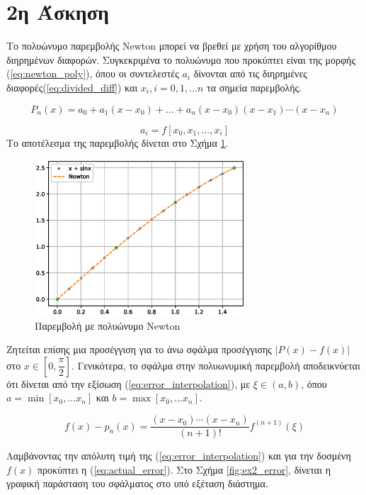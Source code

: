 \documentclass[assignment3.tex]{subfiles}
\begin{document}
\section*{2η Άσκηση}
Το πολυώνυμο παρεμβολής \textlatin{Newton} μπορεί να βρεθεί με χρήση του αλγορίθμου διηρημένων διαφορών. Συγκεκριμένα το πολυώνυμο που προκύπτει είναι της μορφής (\ref{eq:newton_poly}), όπου οι συντελεστές $a_i$ δίνονται από τις διηρημένες διαφορές(\ref{eq:divided_diff}) και $x_i,i=0,1,\dots n$ τα σημεία παρεμβολής. 

\begin{equation}
P_n(x) = a_0 + a_1(x-x_0) + \dots + a_n(x-x_0)(x-x_1)\cdots (x-x_n)
\label{eq:newton_poly}
\end{equation}

\begin{equation}
a_i = f[x_0, x_1, \dots, x_i]
\label{eq:divided_diff}
\end{equation}
Το αποτέλεσμα της παρεμβολής δίνεται στο Σχήμα \ref{fig:ex2}.
\begin{figure}[hp]
	\includegraphics[width=0.7\textwidth]{ex2.eps}
	\centering
	\caption{Παρεμβολή με πολυώνυμο \textlatin{Newton}}
	\label{fig:ex2}
\end{figure}

Zητείται επίσης μια προσέγγιση για το άνω σφάλμα προσέγγισης $|P(x)-f(x)|$ στο $x\in[0,\dfrac{\pi}{2}]$. Γενικότερα, το σφάλμα στην πολυωνυμική παρεμβολή αποδεικνύεται ότι δίνεται από την εξίσωση (\ref{eq:error_interpolation}), με $\xi\in (a, b)$, όπου $a=\min[x_0, \dots x_n]$ και $b=\max[x_0, \dots x_n]$.

\begin{equation}
f(x)-p_n(x)=\frac{(x-x_0)\cdots(x-x_n)}{(n+1)!}f^{(n+1)}(\xi)
\label{eq:error_interpolation}
\end{equation}

Λαμβάνοντας την απόλυτη τιμή της (\ref*{eq:error_interpolation}) και για την δοσμένη $f(x)$ προκύπτει η (\ref{eq:actual_error}). Στο Σχήμα \ref{fig:ex2_error}, δίνεται η γραφική παράσταση του σφάλματος στο υπό εξέταση διάστημα.
\end{document}
